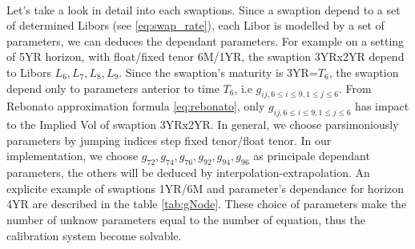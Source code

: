 \documentclass[a4paper,10pt]{article}
\begin{document}
\paragraph{} Let's take a look in detail into each swaptions. Since a swaption depend to a set of determined Libors (see \ref{eq:swap_rate}), each Libor is modelled by a set of parameters, we can deduces the dependant parameters. For example on a setting of 5YR horizon, with float/fixed tenor 6M/1YR, the swaption 3YRx2YR depend to Libors $L_6,L_7,L_8,L_9$. Since the swaption's maturity is 3YR=$T_6$, the swaption depend only to parameters anterior to time $T_6$, i.e $g_{ij, 6\leq i\leq 9,1\leq j\leq6}$. From Rebonato approximation formula \ref{eq:rebonato}, only $g_{ij, 6\leq i\leq 9,1\leq j\leq6}$ has impact to the Implied Vol of swaption 3YRx2YR. In general, we choose parsimoniously parameters by jumping indices step fixed tenor/float tenor. In our implementation, we choose $g_{72},g_{74},g_{76},g_{92},g_{94},g_{96}$ as principale dependant parameters, the others will be deduced by interpolation-extrapolation. An explicite example of swaptions 1YR/6M and parameter's dependance for horizon 4YR are described in the table \ref{tab:gNode}. These choice of parameters make the number of unknow parameters equal to the number of equation, thus the calibration system become solvable.
\end{document}
